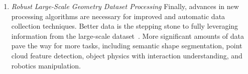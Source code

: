 \begin{enumerate}
\item \emph{Robust Large-Scale Geometry Dataset Processing}
Finally, advances in new processing algorithms are necessary for improved and automatic data collection techniques. 
Better data is the stepping stone to fully leveraging information from the large-scale dataset~\cite{koch2019abc,zhou2016thingi10k}. 
More significant amounts of data pave the way for more tasks, including semantic shape segmentation, point cloud feature detection, object physics with interaction understanding, and robotics manipulation.

\end{enumerate}

